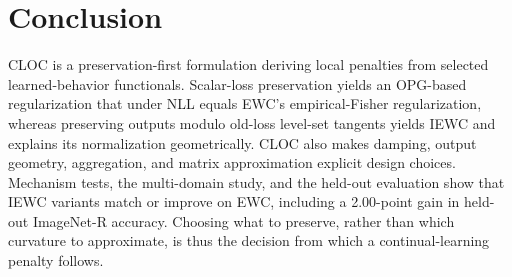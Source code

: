 \section{Conclusion}

CLOC is a preservation-first formulation deriving local penalties from selected learned-behavior functionals. Scalar-loss preservation yields an OPG-based regularization that under NLL equals EWC's empirical-Fisher regularization, whereas preserving outputs modulo old-loss level-set tangents yields IEWC and explains its normalization geometrically. CLOC also makes damping, output geometry, aggregation, and matrix approximation explicit design choices. Mechanism tests, the multi-domain study, and the held-out evaluation show that IEWC variants match or improve on EWC, including a 2.00-point gain in held-out ImageNet-R accuracy. Choosing what to preserve, rather than which curvature to approximate, is thus the decision from which a continual-learning penalty follows.
